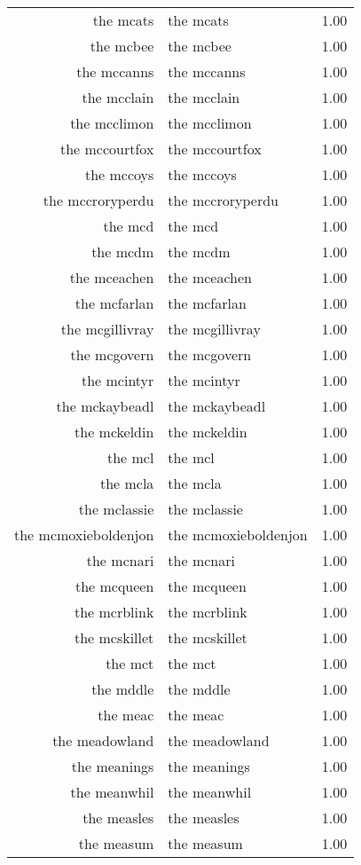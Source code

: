 \begin{table}[ht]
\begin{tabular}{rlr}
  the mcats & the mcats & 1.00 \\ 
  the mcbee & the mcbee & 1.00 \\ 
  the mccanns & the mccanns & 1.00 \\ 
  the mcclain & the mcclain & 1.00 \\ 
  the mcclimon & the mcclimon & 1.00 \\ 
  the mccourtfox & the mccourtfox & 1.00 \\ 
  the mccoys & the mccoys & 1.00 \\ 
  the mccroryperdu & the mccroryperdu & 1.00 \\ 
  the mcd & the mcd & 1.00 \\ 
  the mcdm & the mcdm & 1.00 \\ 
  the mceachen & the mceachen & 1.00 \\ 
  the mcfarlan & the mcfarlan & 1.00 \\ 
  the mcgillivray & the mcgillivray & 1.00 \\ 
  the mcgovern & the mcgovern & 1.00 \\ 
  the mcintyr & the mcintyr & 1.00 \\ 
  the mckaybeadl & the mckaybeadl & 1.00 \\ 
  the mckeldin & the mckeldin & 1.00 \\ 
  the mcl & the mcl & 1.00 \\ 
  the mcla & the mcla & 1.00 \\ 
  the mclassie & the mclassie & 1.00 \\ 
  the mcmoxieboldenjon & the mcmoxieboldenjon & 1.00 \\ 
  the mcnari & the mcnari & 1.00 \\ 
  the mcqueen & the mcqueen & 1.00 \\ 
  the mcrblink & the mcrblink & 1.00 \\ 
  the mcskillet & the mcskillet & 1.00 \\ 
  the mct & the mct & 1.00 \\ 
  the mddle & the mddle & 1.00 \\ 
  the meac & the meac & 1.00 \\ 
  the meadowland & the meadowland & 1.00 \\ 
  the meanings & the meanings & 1.00 \\ 
  the meanwhil & the meanwhil & 1.00 \\ 
  the measles & the measles & 1.00 \\ 
  the measum & the measum & 1.00 \\ 

\end{tabular}
\end{table}
